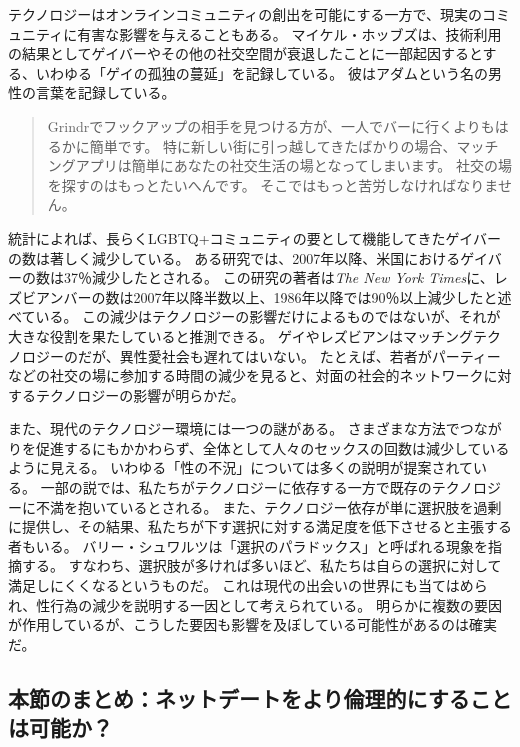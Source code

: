 \documentclass[paper=a4,book,openany]{jlreq}
\begin{document}
テクノロジーはオンラインコミュニティの創出を可能にする一方で、現実のコミュニティに有害な影響を与えることもある。
マイケル・ホッブズは、技術利用の結果としてゲイバーやその他の社交空間が衰退したことに一部起因するとする、いわゆる「ゲイの孤独の蔓延」を記録している。
彼はアダムという名の男性の言葉を記録している。
\begin{quote}
  Grindrでフックアップの相手を見つける方が、一人でバーに行くよりもはるかに簡単です。
特に新しい街に引っ越してきたばかりの場合、マッチングアプリは簡単にあなたの社交生活の場となってしまいます。
社交の場を探すのはもっとたいへんです。
そこではもっと苦労しなければなりません。
\citep{hobbes17:_toget_alone}
\end{quote}

統計によれば、長らくLGBTQ+コミュニティの要として機能してきたゲイバーの数は著しく減少している。
ある研究では、2007年以降、米国におけるゲイバーの数は37％減少したとされる\citep{mattson19:_are_gay_bars_closin}。
この研究の著者は\emph{The New York Times}に、レズビアンバーの数は2007年以降半数以上、1986年以降では90％以上減少したと述べている\citep{wilson20:_where_did_all_lesbian_bars_go}。
この減少はテクノロジーの影響だけによるものではないが、それが大きな役割を果たしていると推測できる。
ゲイやレズビアンはマッチングテクノロジーのだが、異性愛社会も遅れてはいない。
たとえば、若者がパーティーなどの社交の場に参加する時間の減少を見ると、対面の社会的ネットワークに対するテクノロジーの影響が明らかだ\citep{wayne15:_death_party}。

また、現代のテクノロジー環境には一つの謎がある。
さまざまな方法でつながりを促進するにもかかわらず、全体として人々のセックスの回数は減少しているように見える。
いわゆる「性の不況」については多くの説明が提案されている\citep{julian18:_why_are_young_peopl_havin}。
一部の説では、私たちがテクノロジーに依存する一方で既存のテクノロジーに不満を抱いているとされる。
また、テクノロジー依存が単に選択肢を過剰に提供し、その結果、私たちが下す選択に対する満足度を低下させると主張する者もいる。
バリー・シュワルツは「選択のパラドックス」と呼ばれる現象を指摘する。
すなわち、選択肢が多ければ多いほど、私たちは自らの選択に対して満足しにくくなるというものだ。
これは現代の出会いの世界にも当てはめられ、性行為の減少を説明する一因として考えられている\citep{svoboda16:_probl_moder_roman_is_too_much_choic}。
明らかに複数の要因が作用しているが、こうした要因も影響を及ぼしている可能性があるのは確実だ。

\subsection{本節のまとめ：ネットデートをより倫理的にすることは可能か？}
\end{document}
